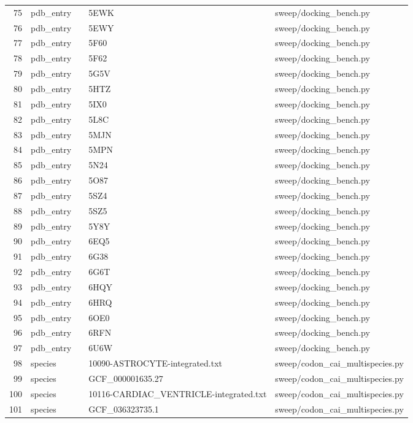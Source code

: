 {\begin{longtable}{rllp{3.2cm}p{4.2cm}}
75 & pdb\_entry &  & 5EWK & sweep/docking\_bench.py\\
76 & pdb\_entry &  & 5EWY & sweep/docking\_bench.py\\
77 & pdb\_entry &  & 5F60 & sweep/docking\_bench.py\\
78 & pdb\_entry &  & 5F62 & sweep/docking\_bench.py\\
79 & pdb\_entry &  & 5G5V & sweep/docking\_bench.py\\
80 & pdb\_entry &  & 5HTZ & sweep/docking\_bench.py\\
81 & pdb\_entry &  & 5IX0 & sweep/docking\_bench.py\\
82 & pdb\_entry &  & 5L8C & sweep/docking\_bench.py\\
83 & pdb\_entry &  & 5MJN & sweep/docking\_bench.py\\
84 & pdb\_entry &  & 5MPN & sweep/docking\_bench.py\\
85 & pdb\_entry &  & 5N24 & sweep/docking\_bench.py\\
86 & pdb\_entry &  & 5O87 & sweep/docking\_bench.py\\
87 & pdb\_entry &  & 5SZ4 & sweep/docking\_bench.py\\
88 & pdb\_entry &  & 5SZ5 & sweep/docking\_bench.py\\
89 & pdb\_entry &  & 5Y8Y & sweep/docking\_bench.py\\
90 & pdb\_entry &  & 6EQ5 & sweep/docking\_bench.py\\
91 & pdb\_entry &  & 6G38 & sweep/docking\_bench.py\\
92 & pdb\_entry &  & 6G6T & sweep/docking\_bench.py\\
93 & pdb\_entry &  & 6HQY & sweep/docking\_bench.py\\
94 & pdb\_entry &  & 6HRQ & sweep/docking\_bench.py\\
95 & pdb\_entry &  & 6OE0 & sweep/docking\_bench.py\\
96 & pdb\_entry &  & 6RFN & sweep/docking\_bench.py\\
97 & pdb\_entry &  & 6U6W & sweep/docking\_bench.py\\
98 & species &  & 10090-ASTROCYTE-integrated.txt & sweep/codon\_cai\_multispecies.py\\
99 & species &  & GCF\_000001635.27 & sweep/codon\_cai\_multispecies.py\\
100 & species &  & 10116-CARDIAC\_VENTRICLE-integrated.txt & sweep/codon\_cai\_multispecies.py\\
101 & species &  & GCF\_036323735.1 & sweep/codon\_cai\_multispecies.py\\

\end{longtable}}
